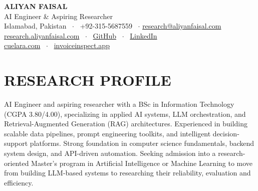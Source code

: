 \documentclass[a4paper,10pt]{article}
\begin{document}
\begin{center}
    {\Huge \bfseries \color{primary} ALIYAN FAISAL} \\[3pt]
    {\large \color{primary} AI Engineer \& Aspiring Researcher} \\[4pt]
    \small Islamabad, Pakistan \ $\cdot$ \ +92-315-5687559 \ $\cdot$ \href{mailto:research@aliyanfaisal.com}{research@aliyanfaisal.com}  \\
     \href{https://research.aliyanfaisal.com}{research.aliyanfaisal.com} \ $\cdot$ \
    \href{https://github.com/aliyanfaisal}{GitHub} \ $\cdot$ \ 
    \href{https://www.linkedin.com/in/aliyan-faisal-5162261b7/}{LinkedIn} \\
    \href{https://cuelara.com}{cuelara.com} \ $\cdot$ \ \href{https://invoiceinspect.app}{invoiceinspect.app}  
\end{center}

\vspace{-4pt}

\section{RESEARCH PROFILE}
AI Engineer and aspiring researcher with a BSc in Information Technology (CGPA 3.80/4.00), specializing in applied AI systems, LLM orchestration, and Retrieval-Augmented Generation (RAG) architectures. Experienced in building scalable data pipelines, prompt engineering toolkits, and intelligent decision-support platforms. Strong foundation in computer science fundamentals, backend system design, and API-driven automation. Seeking admission into a research-oriented Master's program in Artificial Intelligence or Machine Learning to move from building LLM-based systems to researching their reliability, evaluation and efficiency.

\end{document}
